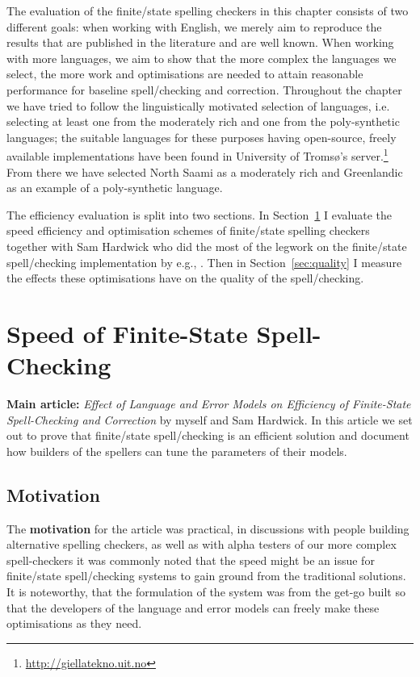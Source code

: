 \documentclass[officiallayout,final]{unihelcompling}
\begin{document}
The evaluation of the finite\-/state spelling checkers in this chapter consists
of two different goals: when working with English, we merely aim to reproduce
the results that are published in the literature and are well known. When
working with more 
languages, we aim to show that the more complex the languages we select, the
more work and optimisations are needed to attain reasonable performance for
baseline spell\-/checking and correction.  Throughout the chapter we have tried
to follow the linguistically motivated selection of languages, i.e. selecting
at least one from the moderately rich and one from the poly-synthetic
languages; the suitable languages for these purposes having open-source, freely
available implementations have been found in University of Tromsø's
server.\footnote{\url{http://giellatekno.uit.no}} From there we have selected
North Saami as a moderately rich and Greenlandic as an example of a
poly-synthetic language.

The efficiency evaluation is split into two sections. In
Section~\ref{sec:speed} I evaluate the speed efficiency and optimisation
schemes of finite\-/state spelling checkers together with Sam Hardwick who did
the most of the legwork on the finite\-/state spell\-/checking implementation
by e.g.,  \citep{linden2011hfst}. Then in Section~\ref{sec:quality} I measure
the effects these optimisations have on the quality of the spell\-/checking.

\section{Speed of Finite-State Spell-Checking}
\label{sec:speed}

\textbf{Main article:} \emph{Effect of Language and Error Models on Efficiency
of Finite-State Spell-Checking and Correction} by myself and Sam Hardwick. In
this article we set out to prove that finite\-/state spell\-/checking is an
efficient solution and document how builders of the spellers can tune the
parameters of their models.

\subsection{Motivation}

The \textbf{motivation} for the article was practical, in discussions with
people building alternative spelling checkers, as well as with alpha testers of
our more complex spell-checkers it was commonly noted that the speed might be
an issue for finite\-/state spell\-/checking systems to gain ground from the
traditional solutions. It is noteworthy, that the formulation of the system was
from the get-go built so that the developers of the language and error models
can freely make these optimisations as they need.
\end{document}

